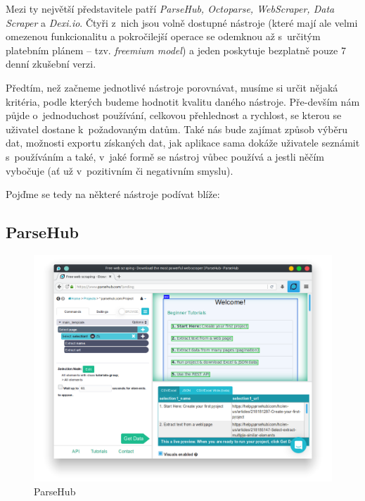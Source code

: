 \documentclass[thesis=B,czech]{FITthesis}[2012/06/26]
\begin{document}
Mezi ty největší představitele patří \emph{ParseHub, Octoparse, WebScraper, Data Scraper} a \emph{Dexi.io}. Čtyři z~nich jsou volně dostupné nástroje (které mají ale velmi omezenou funkcionalitu a pokročilejší operace se odemknou až s~určitým platebním plánem -- tzv. \emph{freemium model}) a jeden poskytuje bezplatně pouze 7 denní zkušební verzi.

Předtím, než začneme jednotlivé nástroje porovnávat, musíme si určit nějaká kritéria, podle kterých budeme hodnotit kvalitu daného nástroje. Pře-devším nám půjde o~jednoduchost používání, celkovou přehlednost a rychlost, se kterou se uživatel dostane k~požadovaným datům. Také nás bude zajímat způsob výběru dat, možnosti exportu získaných dat, jak aplikace sama dokáže uživatele seznámit s~používáním a také, v~jaké formě se nástroj vůbec používá a jestli něčím vybočuje (ať už v~pozitivním či negativním smyslu). 

Poj\v{d}me se tedy na některé nástroje podívat blíže:

\subsection{ParseHub}
\begin{figure}[h]
	\includegraphics[width=\linewidth]{images/ParseHub.png}
	\caption{ParseHub}
	\label{fig:parseHub}
\end{figure}
\end{document}
